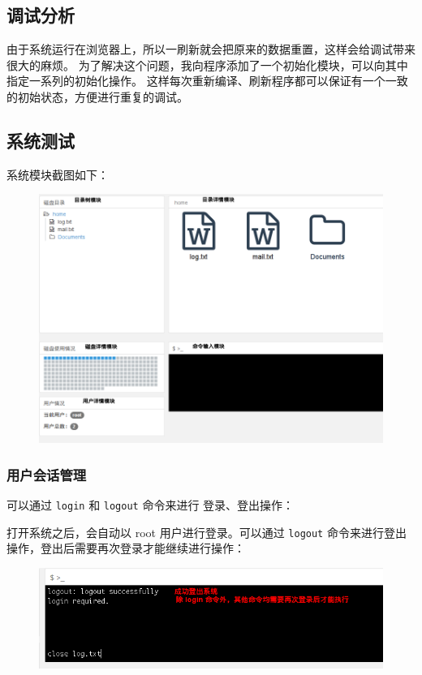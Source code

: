 \documentclass[12bp]{guo}
\begin{document}
\subsection{调试分析}

由于系统运行在浏览器上，所以一刷新就会把原来的数据重置，这样会给调试带来很大的麻烦。
为了解决这个问题，我向程序添加了一个初始化模块，可以向其中指定一系列的初始化操作。
这样每次重新编译、刷新程序都可以保证有一个一致的初始状态，方便进行重复的调试。

\clearpage
\subsection{系统测试}

系统模块截图如下：

\begin{figure}[h!]
    \centering
        \includegraphics[scale=0.5]{figures/fs-app.overview.png}
\end{figure}

\clearpage

\subsubsection{用户会话管理}

可以通过 \texttt{login} 和 \texttt{logout} 命令来进行
登录、登出操作：

打开系统之后，会自动以 root 用户进行登录。可以通过 \texttt{logout}
命令来进行登出操作，登出后需要再次登录才能继续进行操作：

\begin{figure}[h!]
    \centering
        \includegraphics[scale=0.7]{figures/fs-app.logout.png}
\end{figure}
\end{document}
